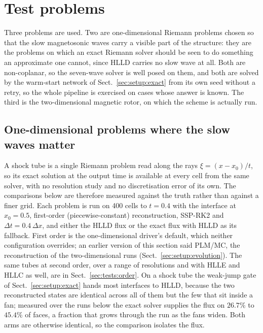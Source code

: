 \section{Test problems}
\label{sec:tests}

Three problems are used. Two are one-dimensional Riemann problems chosen so
that the slow magnetosonic waves carry a visible part of the structure: they
are the problems on which an exact Riemann solver should be seen to do
something an approximate one cannot, since HLLD carries no slow wave at all.
Both are non-coplanar, so the seven-wave solver is well posed on them, and
both are solved by the warm-start network of Sect.~\ref{sec:setup:exact} from
its own seed without a retry, so the whole pipeline is exercised on cases
whose answer is known. The third is the two-dimensional magnetic rotor, on
which the scheme is actually run.

\subsection{One-dimensional problems where the slow waves matter}
\label{sec:tests:1d}

A shock tube is a single Riemann problem read along the rays
$\xi = (x - x_0)/t$, so its exact solution at the output time is available at
every cell from the same solver, with no resolution study and no
discretisation error of its own. The comparisons below are therefore
measured against the truth rather than against a finer grid. Each problem is
run on 400 cells to $t = 0.4$ with the interface at $x_0 = 0.5$, first-order
(piecewise-constant) reconstruction, SSP-RK2 and $\Delta t = 0.4\,\Delta x$,
and either the HLLD flux or the exact flux with HLLD as its fallback. First
order is the one-dimensional driver's default, which neither configuration
overrides; an earlier version of this section said PLM/MC, the reconstruction
of the two-dimensional runs (Sect.~\ref{sec:setup:evolution}). The same tubes
at second order, over a range of resolutions and with HLLE and HLLC as well,
are in Sect.~\ref{sec:tests:order}. On a shock tube the weak-jump
gate of Sect.~\ref{sec:setup:exact} hands most interfaces to HLLD, because
the two reconstructed states are identical across all of them but the few
that sit inside a fan; measured over the runs below the exact solver supplies
the flux on $26.7\%$ to $45.4\%$ of faces, a fraction that grows through the
run as the fans widen. Both arms are otherwise identical, so the comparison
isolates the flux.

